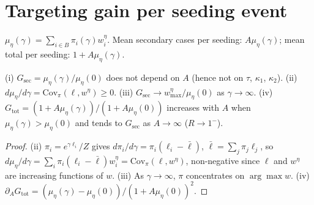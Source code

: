 \section{Targeting gain per seeding event}\label{sec:gain}

\begin{definition}
$\mu_\eta(\gamma)=\sum_{i\in B}\pi_i(\gamma)w_i^\eta$. Mean secondary cases per seeding:
$A\mu_\eta(\gamma)$; mean total per seeding: $1+A\mu_\eta(\gamma)$.
\end{definition}

\begin{proposition}\label{prop:gain}
(i) $G_{\mathrm{sec}}=\mu_\eta(\gamma)/\mu_\eta(0)$ does not depend on $A$ (hence not on
$\tau$, $\kappa_1$, $\kappa_2$). (ii) $d\mu_\eta/d\gamma=\mathrm{Cov}_\pi(\ell,w^\eta)\ge0$.
(iii) $G_{\mathrm{sec}}\to w_{\max}^\eta/\mu_\eta(0)$ as $\gamma\to\infty$.
(iv) $G_{\mathrm{tot}}=(1+A\mu_\eta(\gamma))/(1+A\mu_\eta(0))$ increases with $A$ when
$\mu_\eta(\gamma)>\mu_\eta(0)$ and tends to $G_{\mathrm{sec}}$ as $A\to\infty$ ($R\to1^-$).
\end{proposition}
\begin{proof}
(ii) $\pi_i=e^{\gamma\ell_i}/Z$ gives $d\pi_i/d\gamma=\pi_i(\ell_i-\bar\ell)$,
$\bar\ell=\sum_j\pi_j\ell_j$, so $d\mu_\eta/d\gamma=\sum_i\pi_i(\ell_i-\bar\ell)w_i^\eta=\mathrm{Cov}_\pi(\ell,w^\eta)$,
non-negative since $\ell$ and $w^\eta$ are increasing functions of $w$.
(iii) As $\gamma\to\infty$, $\pi$ concentrates on $\arg\max w$. (iv)
$\partial_AG_{\mathrm{tot}}=(\mu_\eta(\gamma)-\mu_\eta(0))/(1+A\mu_\eta(0))^2$.
\end{proof}

